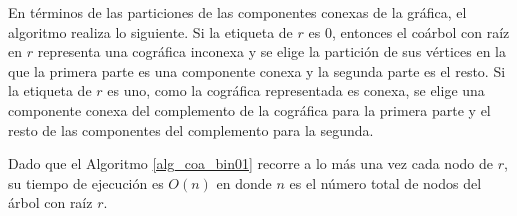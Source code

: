 En términos de las particiones de las componentes conexas de la gráfica,
el algoritmo realiza lo siguiente. Si la etiqueta de $r$ es $0$, entonces
el coárbol con raíz en $r$ representa una cográfica inconexa y se elige
la partición de sus vértices en la que la primera parte es una componente
conexa y la segunda parte es el resto. Si la etiqueta de $r$ es uno, como
la cográfica representada es conexa, se elige una componente conexa del
complemento de la cográfica para la primera parte y el resto de las
componentes del complemento para la segunda.

Dado que el Algoritmo \ref{alg_coa_bin01} recorre a lo más una vez cada nodo de $r$, su tiempo de ejecución es $O(n)$ en donde $n$ es el número total de nodos del árbol con raíz $r$.
